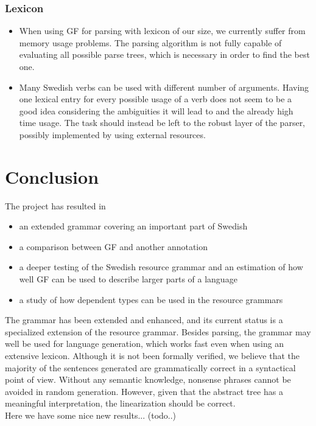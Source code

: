 \documentclass[runningheads,a4paper]{llncs}
\begin{document}
\subsubsection{Lexicon}
\label{sec:futureValency}
\begin{itemize}
\item When using GF for parsing with lexicon of our size, we currently
suffer from memory usage problems. The parsing algorithm is not fully
capable of evaluating all possible parse trees, which is necessary in order
to find the best one.

\item
Many Swedish verbs can be used with different number of arguments.
Having one lexical entry for every possible usage of a verb
does not seem to be a good idea considering
the ambiguities it will lead to and the already high time usage.
The task should instead be left to the robust layer of the parser, possibly
implemented by using external resources.

\end{itemize}


\section{Conclusion}

The project has resulted in
\begin{itemize}
\item an extended grammar covering an important part of Swedish
\item a comparison between GF and another annotation
\item a deeper testing of the Swedish resource grammar and an estimation
of how well GF can be used to describe larger parts of a language
\item a study of how dependent types can be used in the resource grammars
\end{itemize}

The grammar has been extended and enhanced, and its current status is
a specialized extension of the resource grammar.
Besides parsing, the grammar may well be used for language generation,
which works fast even when using an extensive lexicon.
Although it is not been formally verified, we believe that the majority of the
sentences generated are grammatically correct in a syntactical point of view.
Without any semantic knowledge, nonsense phrases cannot be avoided in
random generation. However, given that the abstract tree has a meaningful
interpretation,
the linearization should be correct. \\

Here we have some nice new results... (todo..)



\end{document}
